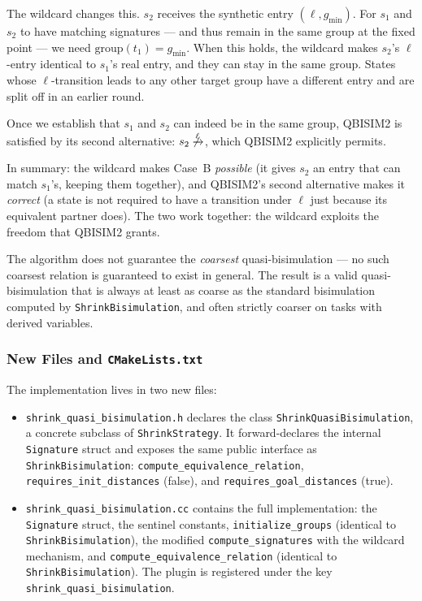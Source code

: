 \documentclass[11pt,a4paper]{article}
\begin{document}
\begin{itemize}
    The wildcard changes this.  $s_2$ receives the synthetic entry
    $(\ell, g_{\min})$.  For $s_1$ and $s_2$ to have matching signatures ---
    and thus remain in the same group at the fixed point --- we need
    $\mathrm{group}(t_1) = g_{\min}$.  When this holds, the wildcard makes
    $s_2$'s $\ell$-entry identical to $s_1$'s real entry, and they can stay
    in the same group.  States whose $\ell$-transition leads to any other
    target group have a different entry and are split off in an earlier round.

    Once we establish that $s_1$ and $s_2$ can indeed be in the same group,
    QBISIM2 is satisfied by its second alternative: $s_2 \not\xrightarrow{\ell}$,
    which QBISIM2 explicitly permits. \checkmark

    In summary: the wildcard makes Case~B \emph{possible} (it gives $s_2$ an
    entry that can match $s_1$'s, keeping them together), and QBISIM2's
    second alternative makes it \emph{correct} (a state is not required to
    have a transition under $\ell$ just because its equivalent partner does).
    The two work together: the wildcard exploits the freedom that QBISIM2
    grants.
\end{itemize}

The algorithm does not guarantee the \emph{coarsest} quasi-bisimulation ---
no such coarsest relation is guaranteed to exist in general.  The result is a
valid quasi-bisimulation that is always at least as coarse as the standard
bisimulation computed by \texttt{ShrinkBisimulation}, and often strictly
coarser on tasks with derived variables.

\subsubsection{New Files and \texttt{CMakeLists.txt}}

The implementation lives in two new files:
\begin{itemize}
  \item \texttt{shrink\_quasi\_bisimulation.h} declares the class
    \texttt{ShrinkQuasiBisimulation}, a concrete subclass of
    \texttt{ShrinkStrategy}.  It forward-declares the internal
    \texttt{Signature} struct and exposes the same public interface as
    \texttt{ShrinkBisimulation}: \texttt{compute\_equivalence\_relation},
    \texttt{requires\_init\_distances} (false), and
    \texttt{requires\_goal\_distances} (true).
  \item \texttt{shrink\_quasi\_bisimulation.cc} contains the full
    implementation: the \texttt{Signature} struct, the sentinel constants,
    \texttt{initialize\_groups} (identical to \texttt{ShrinkBisimulation}),
    the modified \texttt{compute\_signatures} with the wildcard mechanism,
    and \texttt{compute\_equivalence\_relation} (identical to
    \texttt{ShrinkBisimulation}).  The plugin is registered under the key
    \texttt{shrink\_quasi\_bisimulation}.
\end{itemize}
\end{document}
